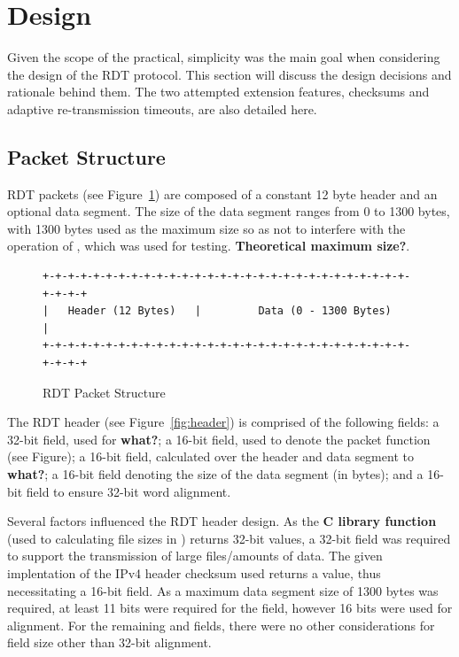 \section{Design}

Given the scope of the practical, simplicity was the main goal when considering the design of the RDT protocol. This section will discuss the design decisions and rationale behind them. The two attempted extension features, checksums and adaptive re-transmission timeouts,  are also detailed here.

\subsection{Packet Structure}

RDT packets (see Figure~\ref{fig:packet}) are composed of a constant 12 byte header and an optional data segment. The size of the data segment ranges from 0 to 1300 bytes, with 1300 bytes used as the maximum size so as not to interfere with the operation of , which was used for testing. \textbf{Theoretical maximum size?}.

\begin{figure}[h]
\begin{verbatim}
+-+-+-+-+-+-+-+-+-+-+-+-+-+-+-+-+-+-+-+-+-+-+-+-+-+-+-+-+-+-+-+-+
|   Header (12 Bytes)   |         Data (0 - 1300 Bytes)         |
+-+-+-+-+-+-+-+-+-+-+-+-+-+-+-+-+-+-+-+-+-+-+-+-+-+-+-+-+-+-+-+-+
\end{verbatim}
\caption{RDT Packet Structure}\label{fig:packet}
\end{figure}

The RDT header (see Figure~\ref{fig:header}) is comprised of the following fields: a 32-bit  field, used for \textbf{what?}; a 16-bit  field, used to denote the packet function (see Figure); a 16-bit  field, calculated over the header and data segment to \textbf{what?}; a 16-bit  field denoting the size of the data segment (in bytes); and a 16-bit  field to ensure 32-bit word alignment.

Several factors influenced the RDT header design. As the \textbf{C library function}  (used to calculating file sizes in ) returns 32-bit  values, a 32-bit  field was required to support the transmission of large files/amounts of data. The given implentation of the IPv4 header checksum used returns a  value, thus necessitating a 16-bit field. As a maximum data segment size of 1300 bytes was required, at least 11 bits were required for the  field, however 16 bits were used for alignment. For the remaining  and  fields, there were no other considerations for field size other than 32-bit alignment. 

